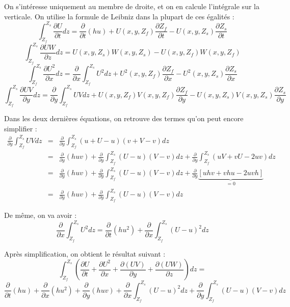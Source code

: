 On s'intéresse uniquement au membre de droite, et on en calcule l'intégrale sur la verticale. On utilise la formule de Leibniz dans la plupart de ces égalités :
\[\int_{Z_f}^{Z_s} \frac{\partial U}{\partial t} dz = \frac{\partial}{\partial t} (hu) + U(x,y,Z_f)\frac{\partial Z_f}{\partial t} - U(x,y,Z_s) \frac{\partial Z_s}{\partial t}\]
\[\int_{Z_f}^{Z_s} \frac{\partial UW}{\partial z} dz =U(x,y,Z_s)W(x,y,Z_s)-U(x,y,Z_f)W(x,y,Z_f)\]
\[\int_{Z_f}^{Z_s} \frac{\partial U^2}{\partial x} dz = \frac{\partial}{\partial x} \int_{Z_f}^{Z_s} U^2 dz + U^2(x,y,Z_f)\frac{\partial Z_f}{\partial x} - U^2(x,y,Z_s) \frac{\partial Z_s}{\partial x}\]
\[\int_{Z_f}^{Z_s} \frac{\partial UV}{\partial y} dz = \frac{\partial}{\partial y} \int_{Z_f}^{Z_s} UV dz + U(x,y,Z_f)V(x,y,Z_f)\frac{\partial Z_f}{\partial y} - U(x,y,Z_s)V(x,y,Z_s) \frac{\partial Z_s}{\partial y}\]

\bigskip
Dans les deux dernières équations, on retrouve des termes qu'on peut encore simplifier :
\begin{eqnarray*}
	\frac{\partial}{\partial y} \int_{Z_f}^{Z_s} UV dz &=& \frac{\partial}{\partial y} \int_{Z_f}^{Z_s} (u+U-u)(v+V-v) dz \\
							&=&\frac{\partial}{\partial y} (huv) + \frac{\partial}{\partial y} \int_{Z_f}^{Z_s} (U-u)(V-v) dz + \frac{\partial}{\partial y} \int_{Z_f}^{Z_s} (uV+vU-2uv) dz \\
							&=&\frac{\partial}{\partial y} (huv) + \frac{\partial}{\partial y} \int_{Z_f}^{Z_s} (U-u)(V-v) dz + \frac{\partial}{\partial y} \underbrace{\left[ uhv + vhu - 2uvh \right]}_{=0} \\
							&=& \frac{\partial}{\partial y} (huv) + \frac{\partial}{\partial y} \int_{Z_f}^{Z_s} (U-u)(V-v) dz
\end{eqnarray*}

De même, on va avoir :
\[\frac{\partial}{\partial x} \int_{Z_f}^{Z_s} U^2 dz= \frac{\partial}{\partial t} (hu^2) + \frac{\partial}{\partial x} \int_{Z_f}^{Z_s} (U-u)^2 dz\]

Après simplification, on obtient le résultat suivant :
\begin{equation} \label{II-3-3} 
	\int_{Z_f}^{Z_s} \left(\frac{\partial U}{\partial t} + \frac{\partial U^2}{\partial x} + \frac{\partial (UV)}{\partial y} +\frac{\partial (UW)}{\partial z}\right) dz = 
\end{equation}
	\[\frac{\partial}{\partial t} (hu) + \frac{\partial}{\partial x}(hu^2)+\frac{\partial}{\partial y}(huv) + \frac{\partial}{\partial x} \int_{Z_f}^{Z_s} (U-u)^2 dz + \frac{\partial}{\partial y} \int_{Z_f}^{Z_s} (U-u)(V-v) dz\]

